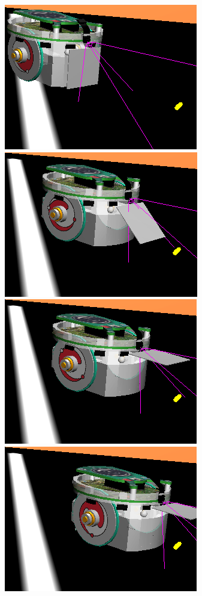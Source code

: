 \begin{figure}[htp]
\begin{center}
\includegraphics[scale=0.25]{comportamientos/collect1.png}
\includegraphics[scale=0.25]{comportamientos/collect2.png}
\includegraphics[scale=0.25]{comportamientos/collect3.png}
\includegraphics[scale=0.25]{comportamientos/collect4.png}

\end{center}
\end{figure}

